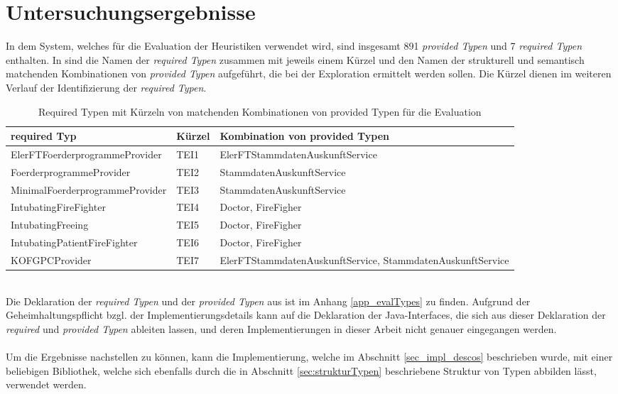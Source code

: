 \chapter{Untersuchungsergebnisse}\label{chap_evaluation}
In dem System, welches für die Evaluation der Heuristiken verwendet wird, sind insgesamt 891 \emph{provided Typen} und 7 \emph{required Typen} enthalten. In  sind die Namen der \emph{required Typen} zusammen mit jeweils einem Kürzel und den Namen der strukturell und semantisch matchenden Kombinationen von \emph{provided Typen} aufgeführt, die bei der Exploration ermittelt werden sollen. Die Kürzel dienen im weiteren Verlauf der Identifizierung der \emph{required Typen}.
\begin{table}[h!]
\centering
\small
\begin{tabular}{|p{6cm}|p{1.5cm}|p{6.5cm}|}
\hline
\hline
\centering\textbf{required Typ} & \textbf{Kürzel} & \textbf{Kombination von provided Typen}\\
\hline
\hline
ElerFTFoerderprogrammeProvider & TEI1 & ElerFTStammdatenAuskunftService\\
\hline
FoerderprogrammeProvider & TEI2 & StammdatenAuskunftService\\
\hline
MinimalFoerderprogrammeProvider & TEI3 & StammdatenAuskunftService\\
\hline
IntubatingFireFighter & TEI4 & Doctor, FireFigher\\
\hline
IntubatingFreeing & TEI5 & Doctor, FireFigher\\
\hline
IntubatingPatientFireFighter & TEI6 & Doctor, FireFigher\\
\hline
KOFGPCProvider & TEI7 & ElerFTStammdatenAuskunftService, StammdatenAuskunftService\\
\hline
\hline
\end{tabular}
\caption{Required Typen mit Kürzeln von matchenden Kombinationen von provided Typen für die Evaluation}
 \label{tab:eIShort}
\end{table}
\noindent
\\
Die Deklaration der \emph{required Typen} und der \emph{provided Typen} aus  ist im Anhang \ref{app_evalTypes} zu finden. Aufgrund der Geheimhaltungspflicht bzgl. der Implementierungsdetails kann auf die Deklaration der Java-Interfaces, die sich aus dieser Deklaration der \emph{required} und \emph{provided Typen} ableiten lassen, und deren Implementierungen in dieser Arbeit nicht genauer eingegangen werden.
\\\\
Um die Ergebnisse nachstellen zu können, kann die Implementierung, welche im Abschnitt \ref{sec_impl_descos} beschrieben wurde, mit einer beliebigen Bibliothek, welche sich ebenfalls durch die in Abschnitt \ref{sec:strukturTypen} beschriebene Struktur von Typen abbilden lässt, verwendet werden.


